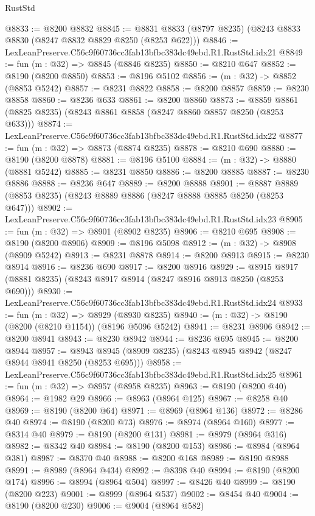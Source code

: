 \begin{lexlean}{RustStd}
\begin{coremodule}
@8833 := @8200 @8832
@8845 := @8831 @8833 (@8797 @8235) (@8243 @8833 @8830 (@8247 @8832 @8829 @8250 (@8253 @622)))
@8846 := LexLeanPreserve.C56c9f60736cc3fab13bfbc383dc49ebd.R1.RustStd.idx21
@8849 := fun (m : @32) => @8845 (@8846 @8235)
@8850 := @8210 @647
@8852 := @8190 (@8200 @8850)
@8853 := @8196 @5102
@8856 := (m : @32) -> @8852 (@8853 @5242)
@8857 := @8231 @8822
@8858 := @8200 @8857
@8859 := @8230 @8858
@8860 := @8236 @633
@8861 := @8200 @8860
@8873 := @8859 @8861 (@8825 @8235) (@8243 @8861 @8858 (@8247 @8860 @8857 @8250 (@8253 @633)))
@8874 := LexLeanPreserve.C56c9f60736cc3fab13bfbc383dc49ebd.R1.RustStd.idx22
@8877 := fun (m : @32) => @8873 (@8874 @8235)
@8878 := @8210 @690
@8880 := @8190 (@8200 @8878)
@8881 := @8196 @5100
@8884 := (m : @32) -> @8880 (@8881 @5242)
@8885 := @8231 @8850
@8886 := @8200 @8885
@8887 := @8230 @8886
@8888 := @8236 @647
@8889 := @8200 @8888
@8901 := @8887 @8889 (@8853 @8235) (@8243 @8889 @8886 (@8247 @8888 @8885 @8250 (@8253 @647)))
@8902 := LexLeanPreserve.C56c9f60736cc3fab13bfbc383dc49ebd.R1.RustStd.idx23
@8905 := fun (m : @32) => @8901 (@8902 @8235)
@8906 := @8210 @695
@8908 := @8190 (@8200 @8906)
@8909 := @8196 @5098
@8912 := (m : @32) -> @8908 (@8909 @5242)
@8913 := @8231 @8878
@8914 := @8200 @8913
@8915 := @8230 @8914
@8916 := @8236 @690
@8917 := @8200 @8916
@8929 := @8915 @8917 (@8881 @8235) (@8243 @8917 @8914 (@8247 @8916 @8913 @8250 (@8253 @690)))
@8930 := LexLeanPreserve.C56c9f60736cc3fab13bfbc383dc49ebd.R1.RustStd.idx24
@8933 := fun (m : @32) => @8929 (@8930 @8235)
@8940 := (m : @32) -> @8190 (@8200 (@8210 @1154)) (@8196 @5096 @5242)
@8941 := @8231 @8906
@8942 := @8200 @8941
@8943 := @8230 @8942
@8944 := @8236 @695
@8945 := @8200 @8944
@8957 := @8943 @8945 (@8909 @8235) (@8243 @8945 @8942 (@8247 @8944 @8941 @8250 (@8253 @695)))
@8958 := LexLeanPreserve.C56c9f60736cc3fab13bfbc383dc49ebd.R1.RustStd.idx25
@8961 := fun (m : @32) => @8957 (@8958 @8235)
@8963 := @8190 (@8200 @40)
@8964 := @1982 @29
@8966 := @8963 (@8964 @125)
@8967 := @8258 @40
@8969 := @8190 (@8200 @64)
@8971 := @8969 (@8964 @136)
@8972 := @8286 @40
@8974 := @8190 (@8200 @73)
@8976 := @8974 (@8964 @160)
@8977 := @8314 @40
@8979 := @8190 (@8200 @131)
@8981 := @8979 (@8964 @316)
@8982 := @8342 @40
@8984 := @8190 (@8200 @153)
@8986 := @8984 (@8964 @381)
@8987 := @8370 @40
@8988 := @8200 @168
@8989 := @8190 @8988
@8991 := @8989 (@8964 @434)
@8992 := @8398 @40
@8994 := @8190 (@8200 @174)
@8996 := @8994 (@8964 @504)
@8997 := @8426 @40
@8999 := @8190 (@8200 @223)
@9001 := @8999 (@8964 @537)
@9002 := @8454 @40
@9004 := @8190 (@8200 @230)
@9006 := @9004 (@8964 @582)

\end{coremodule}
\end{lexlean}
